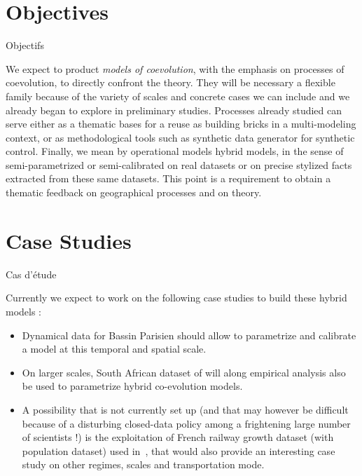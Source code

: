 


\section*{Objectives}{Objectifs}


We expect to product \emph{models of coevolution}, 
 with the emphasis on processes of coevolution, to directly confront the theory. They will be necessary a flexible family because of the variety of scales and concrete cases we can include and we already began to explore in preliminary studies. Processes already studied can serve either as a thematic bases for a reuse as building bricks in a multi-modeling context, or as methodological tools such as synthetic data generator for synthetic control. Finally, we mean by operational models hybrid models, in the sense of semi-parametrized or semi-calibrated on real datasets or on precise stylized facts extracted from these same datasets. This point is a requirement to obtain a thematic feedback on geographical processes and on theory.



\section*{Case Studies}{Cas d'étude}

Currently we expect to work on the following case studies to build these hybrid models :

\begin{itemize}
\item Dynamical data for Bassin Parisien should allow to parametrize and calibrate a model at this temporal and spatial scale.
\item On larger scales, South African dataset of  will along empirical analysis also be used to parametrize hybrid co-evolution models.
\item A possibility that is not currently set up (and that may however be difficult because of a disturbing closed-data policy among a frightening large number of scientists !) is the exploitation of French railway growth dataset (with population dataset) used in~\cite{bretagnolle:tel-00459720}, that would also provide an interesting case study on other regimes, scales and transportation mode.
\end{itemize}



